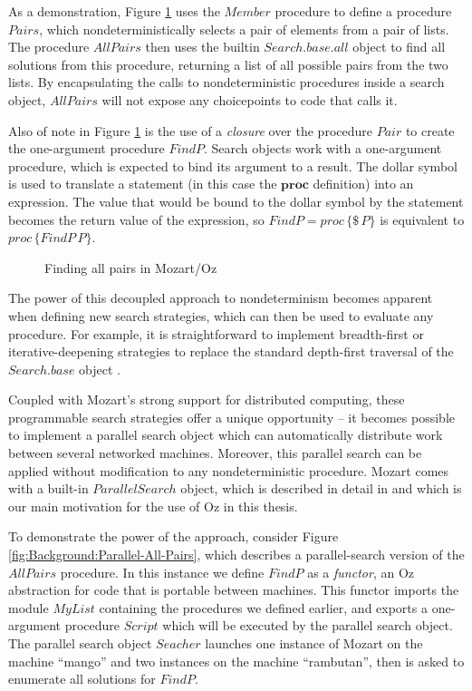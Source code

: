 As a demonstration, Figure \ref{fig:Background:All-Pairs} uses the
$Member$ procedure to define a procedure $Pairs$, which nondeterministically
selects a pair of elements from a pair of lists. The procedure $AllPairs$
then uses the builtin $Search.base.all$ object to find all solutions
from this procedure, returning a list of all possible pairs from the
two lists. By encapsulating the calls to nondeterministic procedures
inside a search object, $AllPairs$ will not expose any choicepoints
to code that calls it.

Also of note in Figure \ref{fig:Background:All-Pairs} is the use
of a \emph{closure} over the procedure $Pair$ to create the one-argument
procedure $FindP$. Search objects work with a one-argument procedure,
which is expected to bind its argument to a result. The dollar symbol
is used to translate a statement (in this case the $\mathbf{proc}$
definition) into an expression. The value that would be bound to the
dollar symbol by the statement becomes the return value of the expression,
so $FindP=proc\,\{\$\, P\}$ is equivalent to $proc\,\{FindP\, P\}$.

%
\begin{figure}[t]

\caption{Finding all pairs in Mozart/Oz\label{fig:Background:All-Pairs}}

\end{figure}


The power of this decoupled approach to nondeterminism becomes apparent
when defining new search strategies, which can then be used to evaluate
any procedure. For example, it is straightforward to implement breadth-first
or iterative-deepening strategies to replace the standard depth-first
traversal of the $Search.base$ object \citep{schulte00constraint_services}.

Coupled with Mozart's strong support for distributed computing, these
programmable search strategies offer a unique opportunity -- it becomes
possible to implement a parallel search object which can automatically
distribute work between several networked machines. Moreover, this
parallel search can be applied without modification to any nondeterministic
procedure. Mozart comes with a built-in $ParallelSearch$ object,
which is described in detail in \citep{schulte00oz_parallel} and
which is our main motivation for the use of Oz in this thesis.

To demonstrate the power of the approach, consider Figure \ref{fig:Background:Parallel-All-Pairs},
which describes a parallel-search version of the $AllPairs$ procedure.
In this instance we define $FindP$ as a \emph{functor}, an Oz abstraction
for code that is portable between machines. This functor imports the
module $MyList$ containing the procedures we defined earlier, and
exports a one-argument procedure $Script$ which will be executed
by the parallel search object. The parallel search object $Seacher$
launches one instance of Mozart on the machine {}``mango'' and two
instances on the machine {}``rambutan'', then is asked to enumerate
all solutions for $FindP$.

